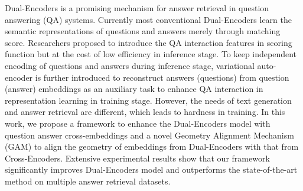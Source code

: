 Dual-Encoders is a promising mechanism for answer retrieval in question answering (QA) systems. Currently most conventional Dual-Encoders learn the semantic representations of questions and answers merely through matching score. Researchers proposed to introduce the QA interaction features in scoring function but at the cost of low efficiency in inference stage. To keep independent encoding of questions and answers during inference stage, variational auto-encoder is further introduced to reconstruct answers (questions) from question (answer) embeddings as an auxiliary task to enhance QA interaction in representation learning in training stage. However, the needs of text generation and answer retrieval are different, which leads to hardness in training. In this work, we propose a framework to enhance the Dual-Encoders model with question answer cross-embeddings and a novel Geometry Alignment Mechanism (GAM) to align the geometry of embeddings from Dual-Encoders with that from Cross-Encoders. Extensive experimental results show that our framework significantly improves Dual-Encoders model and outperforms the state-of-the-art method on multiple answer retrieval datasets.
